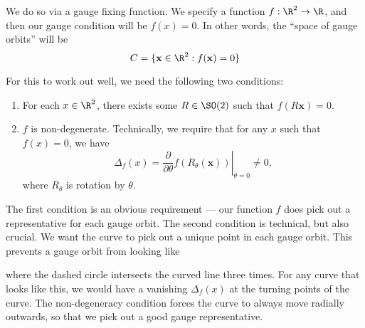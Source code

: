 \documentclass[a4paper]{article}
\begin{document}
We do so via a gauge fixing function. We specify a function $f: \R^2 \to \R$, and then our gauge condition will be $f(x) = 0$. In other words, the ``space of gauge orbits'' will be
\[
  C = \{\mathbf{x} \in \R^2: f(\mathbf{x}) = 0\}
\]
\begin{center}
\end{center}
For this to work out well, we need the following two conditions:
\begin{enumerate}
  \item For each $x \in \R^2$, there exists some $R \in \SO(2)$ such that $f(R \mathbf{x}) = 0$.
  \item $f$ is non-degenerate. Technically, we require that for any $x$ such that $f(x) = 0$, we have
    \[
      \Delta_f (x) = \left.\frac{\partial}{\partial \theta} f(R_\theta(\mathbf{x}))\right|_{\theta = 0} \not= 0,
    \]
    where $R_\theta$ is rotation by $\theta$.
\end{enumerate}
The first condition is an obvious requirement --- our function $f$ does pick out a representative for each gauge orbit. The second condition is technical, but also crucial. We want the curve to pick out a unique point in each gauge orbit. This prevents a gauge orbit from looking like
\begin{center}
\end{center}
where the dashed circle intersects the curved line three times. For any curve that looks like this, we would have a vanishing $\Delta_f(x)$ at the turning points of the curve. The non-degeneracy condition forces the curve to always move radially outwards, so that we pick out a good gauge representative.
\end{document}
